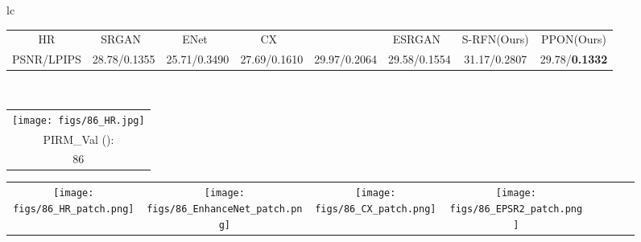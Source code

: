 \documentclass[preprint]{elsarticle}
\begin{document}
\begin{figure*}[htpb]
{\begin{tabular}{lc}
\begin{adjustbox}{valign=t}
\begin{tabular}{cccccccc}
					HR & \hspace{-3mm} SRGAN~\cite{SRGAN} & \hspace{-3mm} ENet~\cite{EnhanceNet} & \hspace{-3mm} CX~\cite{CX} & \hspace{-3mm} ~\cite{EPSR} & \hspace{-3mm} ESRGAN~\cite{ESRGAN} & \hspace{-3mm} S-RFN(Ours) & \hspace{-3mm} PPON(Ours)\\
					
					PSNR/LPIPS & \hspace{-3mm} 28.78/0.1355 & \hspace{-3mm} 25.71/0.3490 & \hspace{-3mm} 27.69/0.1610 & \hspace{-3mm} 29.97/0.2064 & \hspace{-3mm} 29.58/0.1554 & \hspace{-3mm} 31.17/0.2807 & \hspace{-3mm} 29.78/\textbf{0.1332} \\
				\end{tabular}
			\end{adjustbox}
			\\
			
\begin{adjustbox}{valign=t}
				\scriptsize
				\begin{tabular}{c}
					\texttt{[image: figs/86\_HR.jpg]} \\
					PIRM\_Val (): \\
					86 \\
				\end{tabular}
			\end{adjustbox}
			\hspace{-3mm}
			\begin{adjustbox}{valign=t}
				\scriptsize
				\begin{tabular}{cccccccc}
					\texttt{[image: figs/86\_HR\_patch.png]} &
					\hspace{-3mm}
					\texttt{[image: figs/86\_EnhanceNet\_patch.png]} &
					\hspace{-3mm}
					\texttt{[image: figs/86\_CX\_patch.png]} &
					\hspace{-3mm}
					\texttt{[image: figs/86\_EPSR2\_patch.png]} &
					\hspace{-3mm}
					

\end{tabular}
\end{adjustbox}
\end{tabular}}
\end{figure*}
\end{document}
